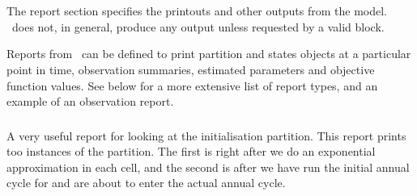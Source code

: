 \section{\label{sec:report-section}}
The report section specifies the printouts and other outputs from the model. \IBM\ does not, in general, produce any output unless requested by a valid  block. 

Reports from \IBM\ can be defined to print partition and states objects at a particular point in time, observation summaries, estimated parameters and objective function values. See below for a more extensive list of report types, and an example of an observation report.


\subsubsection{}
A very useful report for looking at the initialisation partition. This report prints too instances of the partition. The first is right after we do an exponential approximation in each cell, and the second is after we have run the initial annual cycle for  and are about to enter the actual annual cycle.


